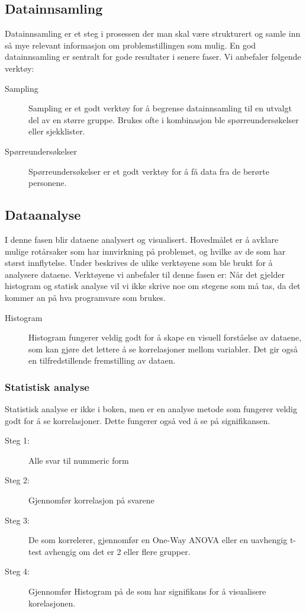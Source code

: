 \subsection{Datainnsamling}
Datainnsamling er et steg i prosessen der man skal være strukturert og samle inn så mye relevant informasjon om problemstillingen som mulig. En god datainnsamling er sentralt for gode resultater i senere faser. Vi anbefaler følgende verktøy:

\begin{description}
    \item[Sampling] Sampling er et godt verktøy for å begrense datainnsamling til en utvalgt del av en større gruppe. Brukes ofte i kombinasjon ble spørreundersøkelser eller sjekklister.
    \item[Spørreundersøkelser] Spørreundersøkelser er et godt verktøy for å få data fra de berørte personene.
\end{description}

\subsection{Dataanalyse}
I denne fasen blir dataene analysert og visualisert. Hovedmålet er å avklare mulige rotårsaker som har innvirkning på problemet, og hvilke av de som har størst innflytelse. Under beskrives de ulike verktøyene som ble brukt for å analysere dataene. Verktøyene vi anbefaler til denne fasen er:
Når det gjelder histogram og statisk analyse vil vi ikke skrive noe om stegene som må tas, da det kommer an på hva programvare som brukes.

\begin{description}
    \item[Histogram] Histogram fungerer veldig godt for å skape en visuell forståelse av dataene, som kan gjøre det lettere å se korrelasjoner mellom variabler. Det gir også en tilfredstillende fremstilling av dataen. 
\end{description}

\subsubsection{Statistisk analyse}
Statistisk analyse er ikke i boken, men er en analyse metode som fungerer veldig godt for å se korrelasjoner. Dette fungerer også ved å se på signifikansen.
\begin{description}
    \item[Steg 1:] Alle svar til nummeric form
    \item[Steg 2:] Gjennomfør korrelasjon på svarene
    \item[Steg 3:] De som korrelerer, gjennomfør en One-Way ANOVA eller en uavhengig t-test avhengig om det er 2 eller flere grupper.
    \item[Steg 4:] Gjennomfør Histogram på de som har signifikans for å visualisere korelasjonen.
\end{description}

